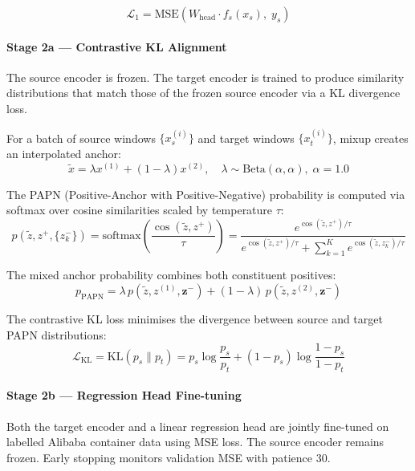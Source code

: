 \documentclass[12pt,a4paper]{article}
\begin{document}
\begin{equation}
    \mathcal{L}_1 = \text{MSE}(W_{\text{head}} \cdot f_s(x_s),\; y_s)
\end{equation}

\paragraph{Stage 2a — Contrastive KL Alignment}
The source encoder is frozen.  The target encoder is trained to produce
similarity distributions that match those of the frozen source encoder via
a KL divergence loss.

For a batch of source windows $\{x_s^{(i)}\}$ and target windows
$\{x_t^{(i)}\}$, mixup creates an interpolated anchor:
\begin{equation}
    \tilde{x} = \lambda x^{(1)} + (1 - \lambda) x^{(2)}, \quad
    \lambda \sim \text{Beta}(\alpha, \alpha), \; \alpha = 1.0
\end{equation}

The PAPN (Positive-Anchor with Positive-Negative) probability is computed via
softmax over cosine similarities scaled by temperature $\tau$:
\begin{equation}
    p(\tilde{z}, z^+, \{z^-_k\}) =
    \text{softmax}\!\left(\frac{\cos(\tilde{z}, z^+)}{\tau}\right)
    = \frac{e^{\cos(\tilde{z}, z^+)/\tau}}
           {e^{\cos(\tilde{z}, z^+)/\tau} + \sum_{k=1}^{K} e^{\cos(\tilde{z}, z^-_k)/\tau}}
\end{equation}

The mixed anchor probability combines both constituent positives:
\begin{equation}
    p_{\text{PAPN}} = \lambda\, p(\tilde{z}, z^{(1)}, \mathbf{z}^-)
                    + (1-\lambda)\, p(\tilde{z}, z^{(2)}, \mathbf{z}^-)
\end{equation}

The contrastive KL loss minimises the divergence between source and target
PAPN distributions:
\begin{equation}
    \mathcal{L}_{\text{KL}} =
    \text{KL}(p_s \| p_t) =
    p_s \log\frac{p_s}{p_t} + (1-p_s)\log\frac{1-p_s}{1-p_t}
\end{equation}

\paragraph{Stage 2b — Regression Head Fine-tuning}
Both the target encoder and a linear regression head are jointly fine-tuned
on labelled Alibaba container data using MSE loss.  The source encoder remains
frozen.  Early stopping monitors validation MSE with patience 30.
\end{document}

